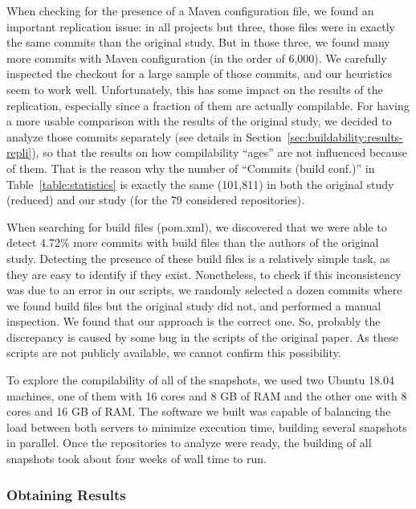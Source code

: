 When checking for the presence of a Maven configuration file, we found an important replication issue: in all projects but three, those files were in exactly the same commits than the original study. But in those three, we found many more commits with Maven configuration (in the order of 6,000). We carefully inspected the checkout for a large sample of those commits, and our heuristics seem to work well. Unfortunately, this has some impact on the results of the replication, especially since a fraction of them are actually compilable. For having a more usable comparison with the results of the original study, we decided to analyze those commits separately (see details in Section~\ref{sec:buildability:results-repli}), so that the results on how compilability ``ages'' are not influenced because of them. That is the reason why the number of ``Commits (build conf.)'' in Table~\ref{table:statistics} is exactly the same (101,811) in both the original study (reduced) and our study (for the 79 considered repositories).

When searching for build files (pom.xml), we discovered that we were able to detect 4.72\% more commits with build files than the authors of the original study.
Detecting the presence of these build files is a relatively simple task, as they are easy to identify if they exist.
Nonetheless, to check if this inconsistency was due to an error in our scripts, we randomly selected a dozen commits where we found build files but the original study did not, and performed a manual inspection.
We found that our approach is the correct one.
So, probably the discrepancy is caused by some bug in the scripts of the original paper. As these scripts are not publicly available, we cannot confirm this possibility.

To explore the compilability of all of the snapshots, we used two Ubuntu 18.04 machines, one of them with 16 cores and 8 GB of RAM and the other one with 8 cores and 16 GB of RAM. The software we built was capable of balancing the load between both servers to minimize execution time, building several snapshots in parallel. Once the repositories to analyze were ready, the building of all snapshots took about four weeks of wall time to run.

\subsubsection{Obtaining Results}

